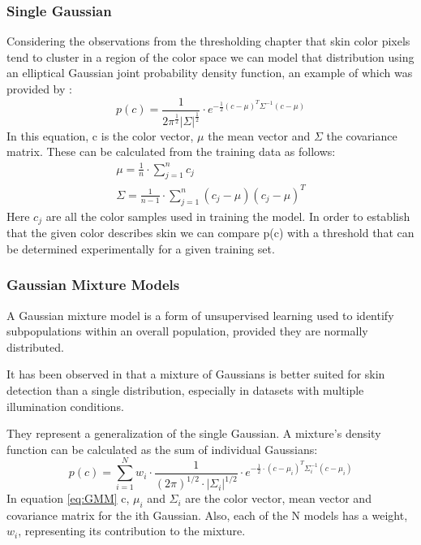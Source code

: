 \documentclass[12pt]{report}
\begin{document}
	\subsubsection{Single Gaussian}
	Considering the observations from the thresholding chapter that skin color pixels tend to cluster in a region of the color space we can model that distribution using an elliptical Gaussian joint probability density function, an example of which was provided by \cite{survey_skin_color_modeling}:
	\begin{equation}
	p(c) = \frac{1}{2\pi^\frac{1}{2}|\Sigma|^\frac{1}{2}} \cdot e^{-\frac{1}{2}(c - \mu)^T\Sigma^{-1}(c - \mu)}
	\end{equation}
	In this equation, c is the color vector, \(\mu\) the mean vector and \(\Sigma\) the covariance matrix. These can be calculated from the training data as follows:
	\begin{equation}
	\begin{split}
	\mu = \frac{1}{n} \cdot \sum_{j=1}^{n} c_j \\
	\Sigma = \frac{1}{n - 1} \cdot \sum_{j=1}^{n}(c_j - \mu)(c_j - \mu)^T
	\end{split}
	\end{equation}
	Here \(c_j\) are all the color samples used in training the model. In order to establish that the given color describes skin we can compare p(c) with a threshold that can be determined experimentally for a given training set.
	
	\subsubsection{Gaussian Mixture Models}
	A Gaussian mixture model is a form of unsupervised learning used to identify subpopulations within an overall population, provided they are normally distributed\cite{gaussian_mixtures}.
	
	It has been observed in \cite{Yang99gaussianmixture} that a mixture of Gaussians is better suited for skin detection than a single distribution, especially in datasets with multiple illumination conditions.
	
	They represent a generalization of the single Gaussian. A mixture's density function can be calculated as the sum of individual Gaussians\cite{survey_skin_color_modeling}:
	\begin{equation} \label{eq:GMM}
	p(c) = \sum_{i=1}^{N}w_i \cdot \frac{1}{(2\pi)^{1/2} \cdot |\Sigma_i|^{1/2}} \cdot e^{-\frac{1}{2} \cdot (c - \mu_i)^T\Sigma_i^{-1}(c - \mu_i)}
	\end{equation}
	In equation \ref{eq:GMM} c, \(\mu_i\) and \(\Sigma_i\) are the color vector, mean vector and covariance matrix for the ith Gaussian. Also, each of the N models has a weight, \(w_i\), representing its contribution to the mixture. 
	
\end{document}
